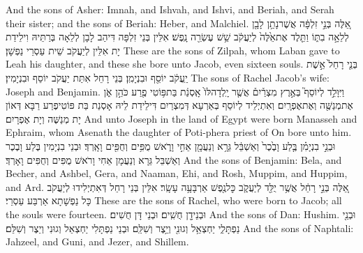 {And the sons of Asher: Imnah, and Ishvah, and Ishvi, and Beriah, and Serah their sister; and the sons of Beriah: Heber, and Malchiel.}{}
{אֵ֚לֶּה בְּנֵ֣י זִלְפָּ֔ה אֲשֶׁר\maqqaf נָתַ֥ן לָבָ֖ן לְלֵאָ֣ה בִתּ֑וֹ וַתֵּ֤לֶד אֶת\maqqaf אֵ֙לֶּה֙ לְיַעֲקֹ֔ב שֵׁ֥שׁ עֶשְׂרֵ֖ה נָֽפֶשׁ׃}
{אִלֵּין בְּנֵי זִלְפָּה דִּיהַב לָבָן לְלֵאָה בְּרַתֵּיהּ וִילֵידַת יָת אִלֵּין לְיַעֲקֹב שֵׁית עַסְרֵי נַפְשָׁן׃}
{These are the sons of Zilpah, whom Laban gave to Leah his daughter, and these she bore unto Jacob, even sixteen souls.}{}
{בְּנֵ֤י רָחֵל֙ אֵ֣שֶׁת יַֽעֲקֹ֔ב יוֹסֵ֖ף וּבִנְיָמִֽן׃}
{בְּנֵי רָחֵל אִתַּת יַעֲקֹב יוֹסֵף וּבִנְיָמִין׃}
{The sons of Rachel Jacob’s wife: Joseph and Benjamin.}{}
{וַיִּוָּלֵ֣ד לְיוֹסֵף֮ בְּאֶ֣רֶץ מִצְרַ֒יִם֒ אֲשֶׁ֤ר יָֽלְדָה\maqqaf לּוֹ֙ אָֽסְנַ֔ת בַּת\maqqaf פּ֥וֹטִי פֶ֖רַע כֹּהֵ֣ן אֹ֑ן אֶת\maqqaf מְנַשֶּׁ֖ה וְאֶת\maqqaf אֶפְרָֽיִם׃}
{וְאִתְיְלֵיד לְיוֹסֵף בְּאַרְעָא דְּמִצְרַיִם דִּילֵידַת לֵיהּ אָסְנַת בַּת פּוֹטִיפֶרַע רַבָּא דְּאוֹן יָת מְנַשֶּׁה וְיָת אֶפְרָיִם׃}
{And unto Joseph in the land of Egypt were born Manasseh and Ephraim, whom Asenath the daughter of Poti-phera priest of On bore unto him.}{}
{וּבְנֵ֣י בִנְיָמִ֗ן בֶּ֤לַע וָבֶ֙כֶר֙ וְאַשְׁבֵּ֔ל גֵּרָ֥א וְנַעֲמָ֖ן אֵחִ֣י וָרֹ֑אשׁ מֻפִּ֥ים וְחֻפִּ֖ים וָאָֽרְדְּ׃}
{וּבְנֵי בִנְיָמִין בֶּלַע וָבֶכֶר וְאַשְׁבֵּל גֵּרָא וְנַעֲמָן אֵחִי וָרֹאשׁ מֻפִּים וְחֻפִּים וָאָרְדְּ׃}
{And the sons of Benjamin: Bela, and Becher, and Ashbel, Gera, and Naaman, Ehi, and Rosh, Muppim, and Huppim, and Ard.}{}
{אֵ֚לֶּה בְּנֵ֣י רָחֵ֔ל אֲשֶׁ֥ר יֻלַּ֖ד לְיַעֲקֹ֑ב כׇּל\maqqaf נֶ֖פֶשׁ אַרְבָּעָ֥ה עָשָֽׂר׃}
{אִלֵּין בְּנֵי רָחֵל דְּאִתְיְלִידוּ לְיַעֲקֹב כָּל נַפְשָׁתָא אַרְבַּע עַסְרֵי׃}
{These are the sons of Rachel, who were born to Jacob; all the souls were fourteen.}{}
{וּבְנֵי\maqqaf דָ֖ן חֻשִֽׁים׃}
{וּבְנֵי דָּן חֻשִׁים׃}
{And the sons of Dan: Hushim.}{}
{וּבְנֵ֖י נַפְתָּלִ֑י יַחְצְאֵ֥ל וְגוּנִ֖י וְיֵ֥צֶר וְשִׁלֵּֽם׃}
{וּבְנֵי נַפְתָּלִי יַחְצְאֵל וְגוּנִי וְיֵצֶר וְשִׁלֵּם׃}
{And the sons of Naphtali: Jahzeel, and Guni, and Jezer, and Shillem.}{}
